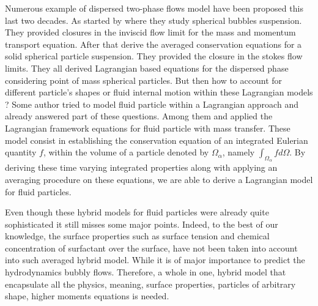 Numerous example of dispersed two-phase flows model have been proposed this last two decades.
As started by \citep{zhang1994averaged,zhang1994ensemble} where they study spherical bubbles suspension.
They provided closures in the inviscid flow limit for the mass and momentum transport equation. 
After that \citet{jackson1997locally,zhang1997momentum} derive the averaged conservation equations for a solid spherical particle suspension.
They provided the closure in the stokes flow limits.  
They all derived Lagrangian based equations for the dispersed phase considering point of mass spherical particles.
But then how to account for different particle's shapes or fluid internal motion within these Lagrangian models ?
Some author tried to model fluid particle within a Lagrangian approach and already answered part of these questions.  
Among them \citet{lhuillier2000bilan} and \citet{morel2015mathematical,zaepffel2012multisize} applied the Lagrangian framework equations for fluid particle with mass transfer. 
These model consist in establishing the conservation equation of an integrated Eulerian quantity $f$, within the volume of a particle denoted by $\Omega_\alpha$, namely  $\int_{\Omega_\alpha} f d\Omega$. 
By deriving these time varying integrated properties along with applying an averaging procedure on these equations, we are able to derive a Lagrangian model for fluid particles. 

Even though these hybrid models for fluid particles were already quite sophisticated it still misses some major points. 
Indeed, to the best of our knowledge, the surface properties such as surface tension and chemical concentration of surfactant over the surface, have not been taken into account into such averaged hybrid model. 
While it is of major importance to predict the hydrodynamics bubbly flows. 
Therefore, a whole in one, hybrid model that encapsulate all the physics, meaning, surface properties, particles of arbitrary shape, higher moments equations is needed. 


